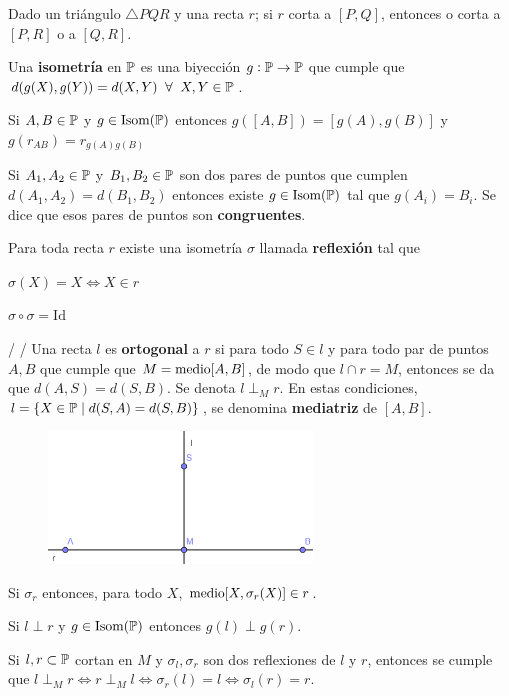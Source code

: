  Dado un triángulo $\triangle PQR$ y una recta $r$; si $r$ corta a $[P,Q]$, entonces o corta a $[P,R]$ o a $[Q, R]$.

 Una \textbf{isometría} en $\P$ es una biyección $g: \P \rightarrow \P$ que cumple que $d(g(X), g(Y)) = d(X,Y) \;\;\forall\;\; X,Y \in \P$.

 Si $A,B \in \P$ y $g \in \iso(\P)$ entonces $g([A,B]) = [g(A), g(B)]$ y $g(r_{AB}) = r_{g(A)g(B)}$ 

 Si $A_1, A_2 \in \P$ y $B_1, B_2 \in \P$ son dos pares de puntos que cumplen $d(A_1,A_2) = d(B_1,B_2)$ entonces existe $g \in \iso(\P)$ tal que $g(A_i) = B_i$. Se dice que esos pares de puntos son \textbf{congruentes}.

 Para toda recta $r$ existe una isometría $\sigma$ llamada \textbf{reflexión} tal que  
\begin{itemizex}
	\item $\sigma(X) = X\iff X \in r$
	\item $\sigma \circ \sigma = \text{Id}$
\end{itemizex}


 /  /  Una recta $l$ es \textbf{ortogonal} a $r$ si para todo $S \in l$ y para todo par de puntos $A, B$ que cumple que $M = \m[A,B]$, de modo que $l \cap r = M$, entonces se da que $d(A,S) = d(S,B)$. Se denota $l \perp_M r$. En estas condiciones, $l = \{X \in \P \; | \; d(S,A) = d(S,B)\}$, se denomina \textbf{mediatriz} de $[A,B]$. 

\begin{figure}[H]
	\centering
	\includegraphics[width=7cm]{figuras/2-23.png}
	\vspace{-1em}
\end{figure}

 Si $\sigma_r$ entonces, para todo $X$, $\m[X, \sigma_r(X)] \in r$.

 Si $l \perp r$ y $g \in \iso(\P)$ entonces $g(l) \perp g(r)$.

\importante{} Si $l, r \subset \P$ cortan en $M$ y $\sigma_l, \sigma_r$ son dos reflexiones de $l$ y $r$, entonces se cumple que $l \perp_M r \iff r \perp_M l \iff \sigma_r(l) = l \iff \sigma_l(r) = r$.

